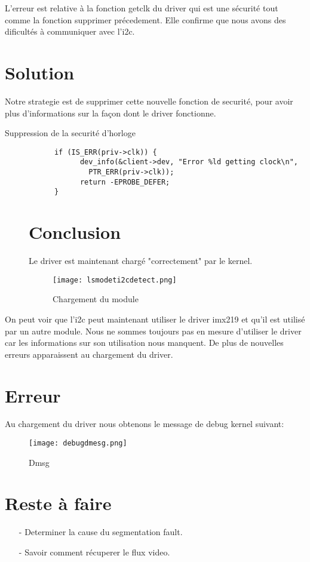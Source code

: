 L'erreur est relative à la fonction getclk du driver qui est une sécurité
 tout comme la fonction supprimer précedement.
Elle confirme que nous avons des dificultés à communiquer avec l'i2c.

\section{Solution}
Notre strategie est de supprimer cette nouvelle fonction de securité, pour avoir plus
d'informations sur la façon dont le driver fonctionne.
\begin{description}
  \item[Suppression de la securité d'horloge]
    \begin{lstlisting}
	  if (IS_ERR(priv->clk)) {
		    dev_info(&client->dev, "Error %ld getting clock\n",
			  PTR_ERR(priv->clk));
		    return -EPROBE_DEFER;
	  }
    \end{lstlisting}
\section{Conclusion}
Le driver est maintenant chargé "correctement" par le kernel.

\begin{figure}[th]
  \centering
  \texttt{[image: lsmodeti2cdetect.png]}
  \decoRule
  \caption{Chargement du module}  \label{fig:chargement}
\end{figure}

    \clearpage
  \end{description}

  On peut voir que l'i2c peut maintenant utiliser le driver imx219 et
  qu'il est utilisé par un autre module. Nous ne sommes toujours pas en mesure
  d'utiliser le driver car les informations sur son utilisation nous manquent.
  De plus de nouvelles erreurs apparaissent au chargement du driver.

  \section{Erreur}
  Au chargement du driver nous obtenons le message de debug kernel suivant:

  \begin{figure}[th]
    \centering
    \texttt{[image: debugdmesg.png]}
    \decoRule
    \caption{Dmsg}  \label{fig:dmsg}
  \end{figure}

  \section{Reste à faire}

  \begin{itemize}
  \item[-] Determiner la cause du segmentation fault.
  \item[-] Savoir comment récuperer le flux video.
  \end{itemize}
